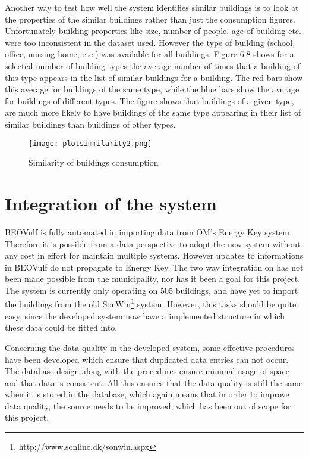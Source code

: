 Another way to test how well the system identifies similar buildings is to look at the properties of the similar buildings rather than just the consumption figures. Unfortunately building properties like size, number of people, age of building etc. were too inconsistent in the dataset used. However the type of building (school, office, nursing home, etc.) was available for all buildings. Figure 6.8 shows for a selected number of building types the average number of times that a building of this type appears in the list of similar buildings for a building. The red bars show this average for buildings of the same type, while the blue bars show the average for buildings of different types. The figure shows that buildings of a given type, are much more likely to have buildings of the same type appearing in their list of similar buildings than buildings of other types.
\begin{figure}
\begin{center}
\texttt{[image: plotsimmilarity2.png]}
\end{center}
\caption{Similarity of buildings consumption}
\end{figure}
\section*{Integration of the system}
BEOVulf is fully automated in importing data from OM’s Energy Key system. Therefore it is possible from a data perspective to adopt the new system without any cost in effort for maintain multiple systems. However updates to informations in BEOVulf do not propagate to Energy Key. The two way integration on has not been made possible from the municipality, nor has it been a goal for this project. The system is currently only operating on 505 buildings, and have yet to import the buildings from the old SonWin\footnote{http://www.sonlinc.dk/sonwin.aspx} system. However, this tasks should be quite easy, since the developed system now have a implemented structure in which these data could be fitted into. 

Concerning the data quality in the developed system, some effective procedures have been developed which ensure that duplicated data entries can not occur. The database design along with the procedures ensure minimal usage of space and that data is consistent. All this ensures that the data quality is still the same when it is stored in the database, which again means that in order to improve data quality, the source needs to be improved, which has been out of scope for this project.
